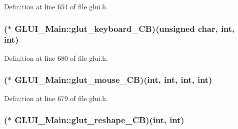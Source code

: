 Definition at line 654 of file glui.\+h.

\hypertarget{class_g_l_u_i___main_a96d36ca6359fb96bca292a9ff7b1d53f}{
\subsubsection[{glut\+\_\+keyboard\+\_\+\+C\+B}]{($\ast$ G\+L\+U\+I\+\_\+\+Main\+::glut\+\_\+keyboard\+\_\+\+C\+B)(unsigned char, {\bf int}, {\bf int})\hspace{0.3cm}{\ttfamily [protected]}}}\label{class_g_l_u_i___main_a96d36ca6359fb96bca292a9ff7b1d53f}


Definition at line 680 of file glui.\+h.

\hypertarget{class_g_l_u_i___main_a8a4d3dfa4aac5817297071f05d808afb}{
\subsubsection[{glut\+\_\+mouse\+\_\+\+C\+B}]{($\ast$ G\+L\+U\+I\+\_\+\+Main\+::glut\+\_\+mouse\+\_\+\+C\+B)({\bf int}, {\bf int}, {\bf int}, {\bf int})\hspace{0.3cm}{\ttfamily [protected]}}}\label{class_g_l_u_i___main_a8a4d3dfa4aac5817297071f05d808afb}


Definition at line 679 of file glui.\+h.

\hypertarget{class_g_l_u_i___main_a93bdf0d34e2f3494dce800ba16da4ec2}{
\subsubsection[{glut\+\_\+reshape\+\_\+\+C\+B}]{($\ast$ G\+L\+U\+I\+\_\+\+Main\+::glut\+\_\+reshape\+\_\+\+C\+B)({\bf int}, {\bf int})\hspace{0.3cm}{\ttfamily [protected]}}}\label{class_g_l_u_i___main_a93bdf0d34e2f3494dce800ba16da4ec2}


